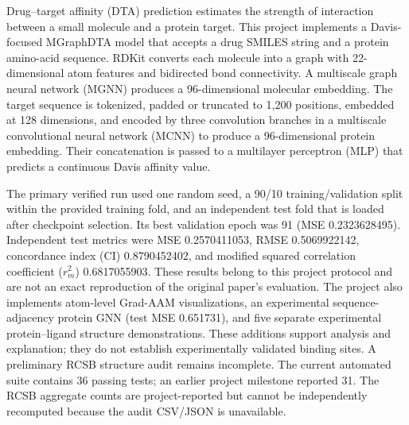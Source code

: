 ﻿Drug--target affinity (DTA) prediction estimates the strength of interaction between a small molecule and a protein target. This project implements a Davis-focused MGraphDTA model that accepts a drug SMILES string and a protein amino-acid sequence. RDKit converts each molecule into a graph with 22-dimensional atom features and bidirected bond connectivity. A multiscale graph neural network (MGNN) produces a 96-dimensional molecular embedding. The target sequence is tokenized, padded or truncated to 1,200 positions, embedded at 128 dimensions, and encoded by three convolution branches in a multiscale convolutional neural network (MCNN) to produce a 96-dimensional protein embedding. Their concatenation is passed to a multilayer perceptron (MLP) that predicts a continuous Davis affinity value.

The primary verified run used one random seed, a 90/10 training/validation split within the provided training fold, and an independent test fold that is loaded after checkpoint selection. Its best validation epoch was 91 (MSE 0.2323628495). Independent test metrics were MSE 0.2570411053, RMSE 0.5069922142, concordance index (CI) 0.8790452402, and modified squared correlation coefficient ($r_m^2$) 0.6817055903. These results belong to this project protocol and are not an exact reproduction of the original paper's evaluation. The project also implements atom-level Grad-AAM visualizations, an experimental sequence-adjacency protein GNN (test MSE 0.651731), and five separate experimental protein--ligand structure demonstrations. These additions support analysis and explanation; they do not establish experimentally validated binding sites. A preliminary RCSB structure audit remains incomplete. The current automated suite contains 36 passing tests; an earlier project milestone reported 31. The RCSB aggregate counts are project-reported but cannot be independently recomputed because the audit CSV/JSON is unavailable.
